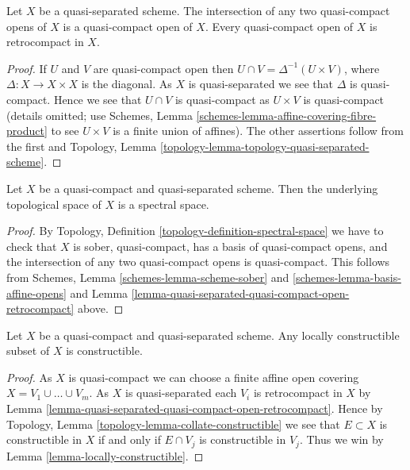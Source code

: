 \begin{lemma}
\label{lemma-quasi-separated-quasi-compact-open-retrocompact}
Let $X$ be a quasi-separated scheme. The intersection of any two
quasi-compact opens of $X$ is a quasi-compact open of $X$.
Every quasi-compact open of $X$ is retrocompact in $X$.
\end{lemma}

\begin{proof}
If $U$ and $V$ are quasi-compact open then
$U \cap V = \Delta^{-1}(U \times V)$, where $\Delta : X \to X \times X$
is the diagonal. As $X$ is quasi-separated we see that $\Delta$ is
quasi-compact. Hence we see that $U \cap V$ is quasi-compact as
$U \times V$ is quasi-compact (details omitted; use
Schemes, Lemma \ref{schemes-lemma-affine-covering-fibre-product}
to see $U \times V$ is a finite union of affines).
The other assertions follow from the first and
Topology, Lemma \ref{topology-lemma-topology-quasi-separated-scheme}.
\end{proof}

\begin{lemma}
\label{lemma-quasi-compact-quasi-separated-spectral}
Let $X$ be a quasi-compact and quasi-separated scheme.
Then the underlying topological space of $X$ is a spectral space.
\end{lemma}

\begin{proof}
By Topology, Definition \ref{topology-definition-spectral-space}
we have to check that $X$ is sober, quasi-compact, has a basis
of quasi-compact opens, and the intersection of any two
quasi-compact opens is quasi-compact. This follows from
Schemes, Lemma \ref{schemes-lemma-scheme-sober} and
\ref{schemes-lemma-basis-affine-opens}
and
Lemma \ref{lemma-quasi-separated-quasi-compact-open-retrocompact}
above.
\end{proof}

\begin{lemma}
\label{lemma-constructible-quasi-compact-quasi-separated}
Let $X$ be a quasi-compact and quasi-separated scheme.
Any locally constructible subset of $X$ is constructible.
\end{lemma}

\begin{proof}
As $X$ is quasi-compact we can choose a finite affine open covering
$X = V_1 \cup \ldots \cup V_m$. As $X$ is quasi-separated each $V_i$ is
retrocompact in $X$ by
Lemma \ref{lemma-quasi-separated-quasi-compact-open-retrocompact}.
Hence by
Topology, Lemma \ref{topology-lemma-collate-constructible}
we see that $E \subset X$ is constructible in $X$ if and only if
$E \cap V_j$ is constructible in $V_j$. Thus we win by
Lemma \ref{lemma-locally-constructible}.
\end{proof}

